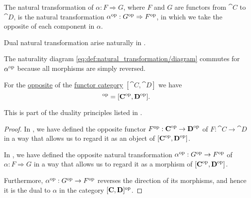 \begin{definition}\label{def:opposite_natural_transformation}
  The  natural transformation of \( \alpha: F \Rightarrow G \), where \( F \) and \( G \) are functors from \( \cat{C} \) to \( \cat{D} \), is the natural transformation \( \alpha^{\operatorname{op}}: G^{\operatorname{op}} \Rightarrow F^{\operatorname{op}} \), in which we take the opposite of each component in \( \alpha \).

  Dual natural transformation arise naturally in .
\end{definition}
\begin{defproof}
  The naturality diagram \eqref{eq:def:natural_transformation/diagram} commutes for \( \alpha^{\operatorname{op}} \) because all morphisms are simply reversed.
\end{defproof}

\begin{proposition}\label{thm:opposite_of_functor_category}
  For the \hyperref[def:opposite_category]{opposite} of the \hyperref[def:functor_category]{functor category} \( [\cat{C}, \cat{D}] \) we have
  \begin{equation*}
    [\cat{C}, \cat{D}]^{\opcat} = [\cat{C}^{\opcat}, \cat{D}^{\opcat}].
  \end{equation*}

  This is part of the duality principles listed in .
\end{proposition}
\begin{proof}
  In , we have defined the opposite functor \( F^{\operatorname{op}}: \operatorname{\mathbf{C}}^{\operatorname{op}} \to \operatorname{\mathbf{D}}^{\operatorname{op}} \) of \( F: \cat{C} \to \cat{D} \) in a way that allows us to regard it as an object of \( [\operatorname{\mathbf{C}}^{\operatorname{op}}, \operatorname{\mathbf{D}}^{\operatorname{op}}] \).

  In , we have defined the opposite natural transformation \( \alpha^{\operatorname{op}}: G^{\operatorname{op}} \to F^{\operatorname{op}} \) of \( \alpha: F \Rightarrow G \) in a way that allows us to regard it as a morphism of \( [\operatorname{\mathbf{C}}^{\operatorname{op}}, \operatorname{\mathbf{D}}^{\operatorname{op}}] \).

  Furthermore, \( \alpha^{\operatorname{op}}: G^{\operatorname{op}} \to F^{\operatorname{op}} \) reverses the direction of its morphisms, and hence it is the dual to \( \alpha \) in the category \( [\operatorname{\mathbf{C}}, \operatorname{\mathbf{D}}]^{\operatorname{op}} \).
\end{proof}


